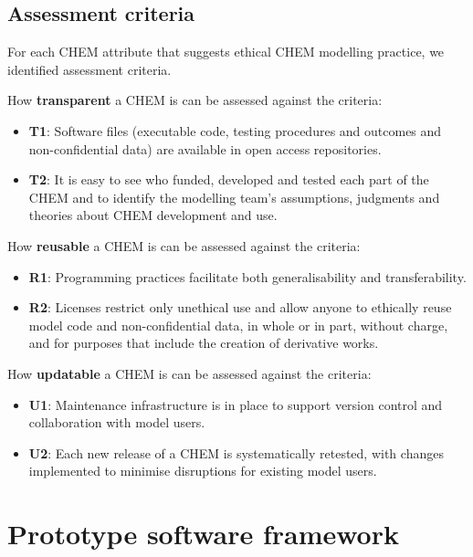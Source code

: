 \documentclass[
]{article}
\begin{document}
\hypertarget{assessment-criteria}{%
\subsection{Assessment criteria}\label{assessment-criteria}}

For each CHEM attribute that suggests ethical CHEM modelling practice, we identified assessment criteria.

How \textbf{transparent} a CHEM is can be assessed against the criteria:

\begin{itemize}
\item
  \textbf{T1}: Software files (executable code, testing procedures and outcomes and non-confidential data) are available in open access repositories.
\item
  \textbf{T2}: It is easy to see who funded, developed and tested each part of the CHEM and to identify the modelling team's assumptions, judgments and theories about CHEM development and use.
\end{itemize}

How \textbf{reusable} a CHEM is can be assessed against the criteria:

\begin{itemize}
\item
  \textbf{R1}: Programming practices facilitate both generalisability and transferability.
\item
  \textbf{R2}: Licenses restrict only unethical use and allow anyone to ethically reuse model code and non-confidential data, in whole or in part, without charge, and for purposes that include the creation of derivative works.
\end{itemize}

How \textbf{updatable} a CHEM is can be assessed against the criteria:

\begin{itemize}
\item
  \textbf{U1}: Maintenance infrastructure is in place to support version control and collaboration with model users.
\item
  \textbf{U2}: Each new release of a CHEM is systematically retested, with changes implemented to minimise disruptions for existing model users.
\end{itemize}

\hypertarget{prototype-software-framework}{%
\section{Prototype software framework}\label{prototype-software-framework}}
\end{document}
